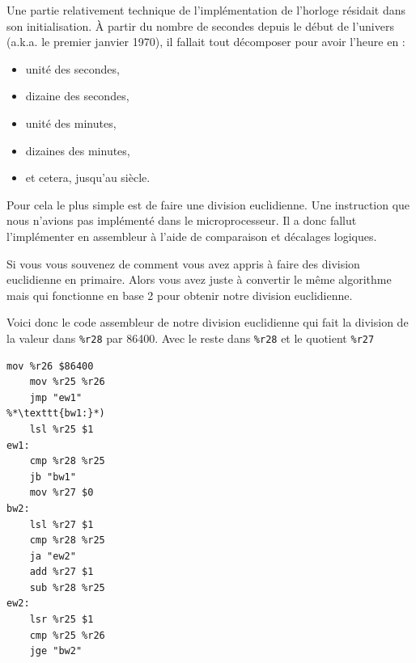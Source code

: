 \documentclass[10pt,a4paper,notitlepage ]{article}
\begin{document}
			Une partie relativement technique de l'implémentation de l'horloge résidait dans son initialisation. À partir du nombre de secondes depuis le début de l'univers (a.k.a. le premier janvier 1970), il fallait tout décomposer pour avoir l'heure en :
			\begin{itemize}
				\item unité des secondes,
				\item dizaine des secondes,
				\item unité des minutes,
				\item dizaines des minutes,
				\item et cetera, jusqu'au siècle.
			\end{itemize}

			Pour cela le plus simple est de faire une division euclidienne. Une instruction que nous n'avions pas implémenté dans le microprocesseur. Il a donc fallut l'implémenter en assembleur à l'aide de comparaison et décalages logiques.

			Si vous vous souvenez de comment vous avez appris à faire des division euclidienne en primaire. Alors vous avez juste à convertir le même algorithme mais qui fonctionne en base 2 pour obtenir notre division euclidienne.

			Voici donc le code assembleur de notre division euclidienne qui fait la division de la valeur dans \texttt{\%r28} par 86400. Avec le reste dans \texttt{\%r28} et le quotient \texttt{\%r27}

\begin{lstlisting}[language={[x86masm]Assembler},morekeywords={lsr}]
	mov %r26 $86400
	mov %r25 %r26
	jmp "ew1"
%*\texttt{bw1:}*)
	lsl %r25 $1
ew1:
	cmp %r28 %r25
	jb "bw1"
	mov %r27 $0
bw2:
	lsl %r27 $1
	cmp %r28 %r25
	ja "ew2"
	add %r27 $1
	sub %r28 %r25
ew2:
	lsr %r25 $1
	cmp %r25 %r26
	jge "bw2"

\end{lstlisting}
\end{document}
